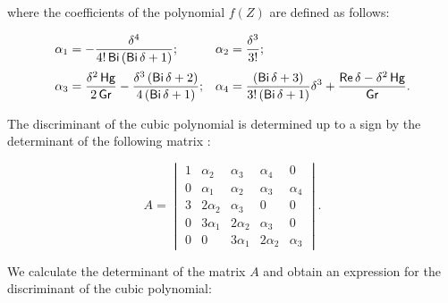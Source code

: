 where the coefficients of the polynomial $f(Z)$ are defined as follows:

\begin{gather}

       \label{eq:VVP_EYP:Alfa}

\begin{array}{ll}

\displaystyle

\alpha_1 = -\frac{\delta^4}{4!\mathop{\sf Bi}\left(\mathop{\sf Bi}\delta+1\right)};

&

\displaystyle

\alpha_2 = \frac{\delta^3}{3!};

\\[4mm]

\displaystyle

\alpha_3 = \frac{\delta^2 \mathop{\sf Hg}}{2\mathop{\sf Gr}}- \frac{\delta^3 \left(\mathop{\sf Bi}\delta+2\right)}{4\left(\mathop{\sf Bi}\delta+1\right)};

&

\displaystyle

\alpha_4 = \frac{\left(\mathop{\sf Bi}\delta+3\right)}{3!\left(\mathop{\sf Bi}\delta+1\right)}\delta^3+\frac{\mathop{\sf Re} \delta - \delta^2 \mathop{\sf Hg}}{\mathop{\sf Gr}}.

\end{array}

 \end{gather}

The discriminant of the cubic polynomial is determined up to a sign by the determinant of the following matrix \cite{ulg:bib:Prasolov}:

$$A=\begin{vmatrix}

1&\alpha_2&\alpha_3&\alpha_4&0\\

0&\alpha_1&\alpha_2&\alpha_3&\alpha_4\\

3&2\alpha_2&\alpha_3&0&0\\

0&3\alpha_1&2\alpha_2&\alpha_3&0\\

0&0&3\alpha_1&2\alpha_2&\alpha_3

\end{vmatrix}.

$$

We calculate the determinant of the matrix $A$ and obtain an expression for the discriminant of the cubic polynomial:

